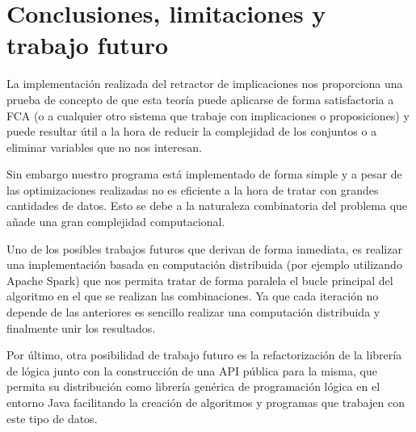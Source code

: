 
\chapter*{Conclusiones, limitaciones y trabajo futuro}

	La implementación realizada del retractor de implicaciones nos proporciona una prueba de concepto de que esta teoría puede aplicarse de forma satisfactoria a FCA (o a cualquier otro sistema que trabaje con implicaciones o proposiciones) y puede resultar útil a la hora de reducir la complejidad de los conjuntos o a eliminar variables que no nos interesan.
	
	Sin embargo nuestro programa está implementado de forma simple y a pesar de las optimizaciones realizadas no es eficiente a la hora de tratar con grandes cantidades de datos. Esto se debe a la naturaleza combinatoria del problema que añade una gran complejidad computacional.	
	
	Uno de los posibles trabajos futuros que derivan de forma inmediata, es realizar una implementación basada en computación distribuida (por ejemplo utilizando Apache Spark) que nos permita tratar de forma paralela el bucle principal del algoritmo en el que se realizan las combinaciones. Ya que cada iteración no depende de las anteriores es sencillo realizar una computación distribuida y finalmente unir los resultados.

	
	Por último, otra posibilidad de trabajo futuro es la refactorización de la librería de lógica junto con la construcción de una API pública para la misma, que permita su distribución como librería genérica de programación lógica en el entorno Java facilitando la creación de algoritmos y programas que trabajen con este tipo de datos.
	
	